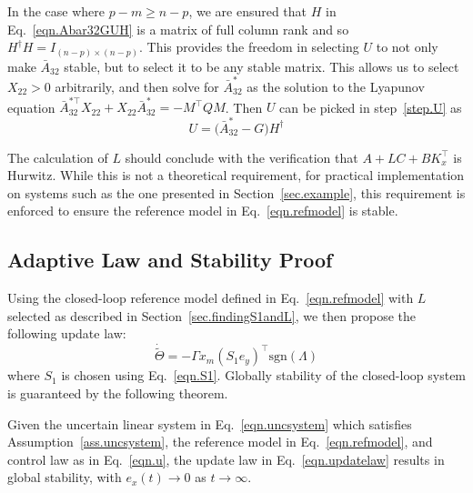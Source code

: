 \documentclass[]{../sty/JGCD}
\theoremstyle{examplestyle}
\begin{document}
  \begin{rem-dan}\label{rem.pmgeqnp}
    In the case where $p-m\geq n-p$, we are ensured that $H$ in Eq.\ \eqref{eqn.Abar32GUH} is a matrix of full column rank and so $H^{\dagger}H=I_{(n-p)\times(n-p)}$.
    This provides the freedom in selecting $U$ to not only make $\bar{A}_{32}$ stable, but to select it to be any stable matrix.
    This allows us to select $X_{22}>0$ arbitrarily, and then solve for $\bar{A}_{32}^{*}$ as the solution to the Lyapunov equation $\bar{A}_{32}^{*\top}X_{22}+X_{22}\bar{A}_{32}^{*}=-M^{\top}QM$.
    Then $U$ can be picked in step~\ref{step.U} as
    \begin{equation}
      \label{eqn.Uremark}
      U=\bigr(\bar{A}_{32}^{*}-G\bigr)H^{\dagger}
    \end{equation}
  \end{rem-dan}

  \begin{rem-dan}
    The calculation of $L$ should conclude with the verification that $A+LC+BK_{x}^{\top}$ is Hurwitz.
    While this is not a theoretical requirement, for practical implementation on systems such as the one presented in Section~\ref{sec.example}, this requirement is enforced to ensure the reference model in Eq.\ \eqref{eqn.refmodel} is stable.
  \end{rem-dan}

  \subsection{Adaptive Law and Stability Proof}\label{sec.adaptivelaw}

  Using the closed-loop reference model defined in Eq.\ \eqref{eqn.refmodel} with $L$ selected as described in Section~\ref{sec.findingS1andL}, we then propose the following update law:
  \begin{equation}
    \label{eqn.updatelaw}
    \dot{\widetilde{\Theta}}=-\Gamma x_{m}(S_{1}e_{y})^{\top}\text{sgn}(\Lambda)
  \end{equation}
  where $S_{1}$ is chosen using Eq.\ \eqref{eqn.S1}.
  Globally stability of the closed-loop system is guaranteed by the following theorem.

  \begin{thm-dan}
    Given the uncertain linear system in Eq.\ \eqref{eqn.uncsystem} which satisfies Assumption~\ref{ass.uncsystem}, the reference model in Eq.\ \eqref{eqn.refmodel}, and control law as in Eq.\ \eqref{eqn.u}, the update law in Eq.\ \eqref{eqn.updatelaw} results in global stability, with $e_{x}(t)\rightarrow0$ as $t\rightarrow\infty$.
  \end{thm-dan}
\end{document}
